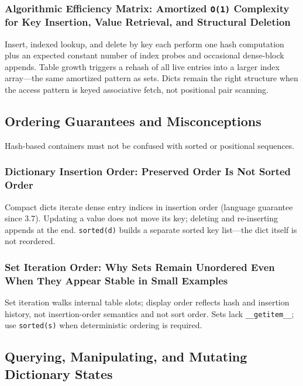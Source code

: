 \documentclass[a4paper,twoside]{report}
\begin{document}
\subsubsection{Algorithmic Efficiency Matrix: Amortized \texttt{O(1)} Complexity for Key Insertion, Value Retrieval, and Structural Deletion}

Insert, indexed lookup, and delete by key each perform one hash computation plus an expected constant number of index probes and occasional dense-block appends. Table growth triggers a rehash of all live entries into a larger index array---the same amortized pattern as sets. Dicts remain the right structure when the access pattern is keyed associative fetch, not positional pair scanning.


\subsection{Ordering Guarantees and Misconceptions}

Hash-based containers must not be confused with sorted or positional sequences.

\subsubsection{Dictionary Insertion Order: Preserved Order Is Not Sorted Order}

Compact dicts iterate dense entry indices in insertion order (language guarantee since 3.7). Updating a value does not move its key; deleting and re-inserting appends at the end. \texttt{sorted(d)} builds a separate sorted key list---the dict itself is not reordered.

\subsubsection{Set Iteration Order: Why Sets Remain Unordered Even When They Appear Stable in Small Examples}

Set iteration walks internal table slots; display order reflects hash and insertion history, not insertion-order semantics and not sort order. Sets lack \texttt{\_\_getitem\_\_}; use \texttt{sorted(s)} when deterministic ordering is required.


\subsection{Querying, Manipulating, and Mutating Dictionary States}
\end{document}
